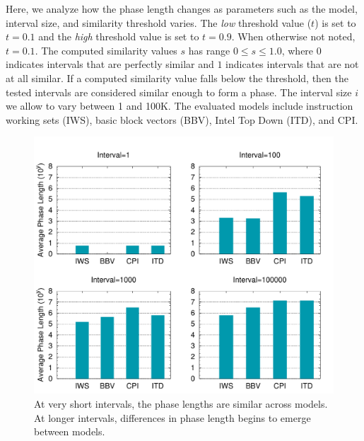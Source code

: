 Here, we analyze how the phase length changes as parameters such as the model, interval size, and similarity threshold varies. The \emph{low} threshold value ($t$) is set to $t=0.1$ and the \emph{high} threshold value is set to $t=0.9$. When otherwise not noted, $t=0.1$. The computed similarity values $s$ has range $0 \leq s \leq 1.0$, where $0$ indicates intervals that are perfectly similar and $1$ indicates intervals that are not at all similar. If a computed similarity value falls below the threshold, then the tested intervals are considered similar enough to form a phase. The interval size $i$ we allow to vary between 1 and 100K. The evaluated models include instruction working sets (IWS), basic block vectors (BBV), Intel Top Down (ITD), and CPI. 

\begin{figure}[htbp]
  \begin{center}
\includegraphics[width=0.99\columnwidth]{figs/phaselenavg}
  \end{center}
  \caption{At very short intervals, the phase lengths are similar across models. At longer intervals, differences in phase length begins to emerge between models.}
  \label{fig:phaselenavg}
\end{figure}

